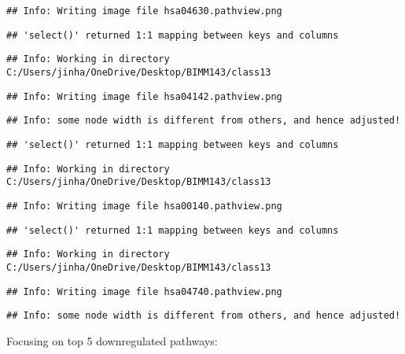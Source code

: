\documentclass[
]{article}
\begin{document}
\begin{verbatim}
## Info: Writing image file hsa04630.pathview.png
\end{verbatim}

\begin{verbatim}
## 'select()' returned 1:1 mapping between keys and columns
\end{verbatim}

\begin{verbatim}
## Info: Working in directory C:/Users/jinha/OneDrive/Desktop/BIMM143/class13
\end{verbatim}

\begin{verbatim}
## Info: Writing image file hsa04142.pathview.png
\end{verbatim}

\begin{verbatim}
## Info: some node width is different from others, and hence adjusted!
\end{verbatim}

\begin{verbatim}
## 'select()' returned 1:1 mapping between keys and columns
\end{verbatim}

\begin{verbatim}
## Info: Working in directory C:/Users/jinha/OneDrive/Desktop/BIMM143/class13
\end{verbatim}

\begin{verbatim}
## Info: Writing image file hsa00140.pathview.png
\end{verbatim}

\begin{verbatim}
## 'select()' returned 1:1 mapping between keys and columns
\end{verbatim}

\begin{verbatim}
## Info: Working in directory C:/Users/jinha/OneDrive/Desktop/BIMM143/class13
\end{verbatim}

\begin{verbatim}
## Info: Writing image file hsa04740.pathview.png
\end{verbatim}

\begin{verbatim}
## Info: some node width is different from others, and hence adjusted!
\end{verbatim}

Focusing on top 5 downregulated pathways:
\end{document}
